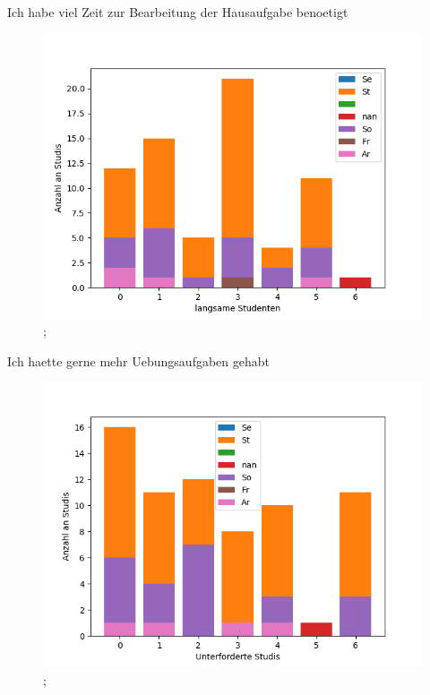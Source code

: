 \documentclass[10pt]{beamer}
\begin{document}
\begin{frame}[fragile]{Ich habe viel Zeit zur Bearbeitung der Hausaufgabe benoetigt} 
 \begin{figure}
 \includegraphics[width= 0.9\linewidth]{./PDFcreater/Plots/SolidEdge/Ich+habe+viel+Zeit+zur+Bearbeitung+der+Hausaufgabe+benoetigt.png};
 \end{figure}
 \end{frame}
\begin{frame}[fragile]{Ich haette gerne mehr Uebungsaufgaben gehabt} 
 \begin{figure}
 \includegraphics[width= 0.9\linewidth]{./PDFcreater/Plots/SolidEdge/Ich+haette+gerne+mehr+Uebungsaufgaben+gehabt.png};
 \end{figure}
 \end{frame}
\end{document}
